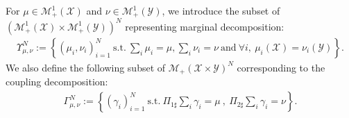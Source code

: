For $\mu\in\mathcal{M}_+^1(\mathcal{X})$ and $\nu\in\mathcal{M}_+^1(\mathcal{Y})$, we introduce the subset of $(\mathcal{M}_+^1(\mathcal{X})\times \mathcal{M}_+^1(\mathcal{Y}))^N$ representing marginal decomposition: 
\begin{align*}
 \textstyle\Upsilon_{\mu,\nu}^N:=\left\{(\mu_i,\nu_i)_{i=1}^N ~\mathrm{ s.t. }~ \sum_i \mu_i = \mu \mathrm{, } \sum_i \nu_i = \nu ~\mathrm{ and }~\forall i,~ \mu_i(\mathcal{X}) = \nu_i(\mathcal{Y})  \right\}.
\end{align*}
We also define the following subset of $\mathcal{M}_+(\mathcal{X}\times \mathcal{Y})^N$ corresponding to the coupling decomposition:
\begin{align*}
    \Gamma^N_{\mu,\nu}:=\left\{(\gamma_i)_{i=1}^N~\mathrm{s.t.}~ \Pi_{1\sharp}\sum_i\gamma_i=\mu ~,~ \Pi_{2\sharp}\sum_i\gamma_i=\nu\right\} .
\end{align*}



